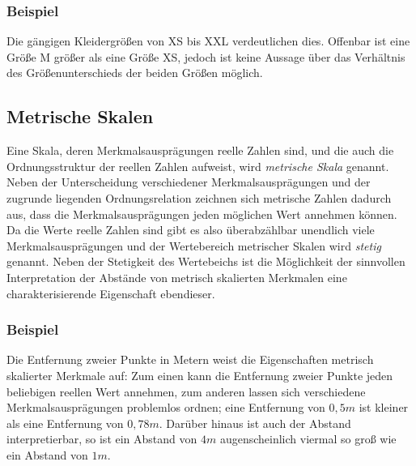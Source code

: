 \documentclass[fontsize=11pt]{scrartcl}
\begin{document}
                    \subsubsection{Beispiel}
                        Die gängigen Kleidergrößen von XS bis XXL verdeutlichen dies. Offenbar ist eine Größe M größer als eine Größe XS, jedoch ist keine Aussage über das Verhältnis des Größenunterschieds der beiden Größen möglich.
                \subsection{Metrische Skalen}
                    Eine Skala, deren Merkmalsausprägungen reelle Zahlen sind, und die auch die Ordnungsstruktur der reellen Zahlen aufweist, wird \emph{metrische Skala} genannt. Neben der Unterscheidung verschiedener Merkmalsausprägungen und der zugrunde liegenden Ordnungsrelation zeichnen sich metrische Zahlen dadurch aus, dass die Merkmalsausprägungen jeden möglichen Wert annehmen können. Da die Werte reelle Zahlen sind gibt es also überabzählbar unendlich viele Merkmalsausprägungen und der Wertebereich metrischer Skalen wird \emph{stetig} genannt. Neben der Stetigkeit des Wertebeichs ist die Möglichkeit der sinnvollen Interpretation der Abstände von metrisch skalierten Merkmalen eine charakterisierende Eigenschaft ebendieser.
                    \cite{kohn2005}
                    \subsubsection{Beispiel}
                        Die Entfernung zweier Punkte in Metern weist die Eigenschaften metrisch skalierter Merkmale auf: Zum einen kann die Entfernung zweier Punkte jeden beliebigen reellen Wert annehmen, zum anderen lassen sich verschiedene Merkmalsausprägungen problemlos ordnen; eine Entfernung von $ 0,5m $ ist kleiner als eine Entfernung von $ 0,78m $. Darüber hinaus ist auch der Abstand interpretierbar, so ist ein Abstand von $4m$ augenscheinlich viermal so groß wie ein Abstand von $1m$.
\end{document}
